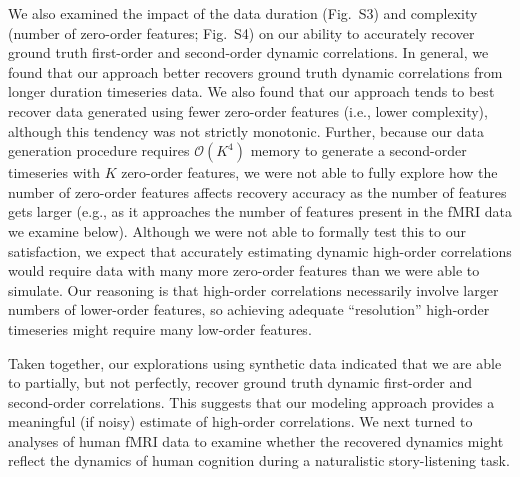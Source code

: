 \documentclass[english]{article}
\newcommand{\timeheatmap}{S3}
\newcommand{\features}{S4}
\begin{document}
We also examined the impact of the data duration (Fig.~\timeheatmap)
and complexity (number of zero-order features; Fig.~\features) on our
ability to accurately recover ground truth first-order and
second-order dynamic correlations.  In general, we found that our approach
better recovers ground truth dynamic correlations from longer duration
timeseries data.  We also found that our approach tends to best recover data generated
using fewer zero-order features (i.e., lower complexity), although
this tendency was not strictly monotonic.  Further, because our data
generation procedure requires $\mathcal{O}(K^{4})$ memory to generate
a second-order timeseries with $K$ zero-order features, we were not
able to fully explore how the number of zero-order features affects
recovery accuracy as the number of features gets larger (e.g., as it
approaches the number of features present in the fMRI data we examine
below).  Although we were not able to formally test this to our
satisfaction, we expect that accurately estimating dynamic high-order
correlations would require data with many more zero-order features
than we were able to simulate.  Our reasoning is that
high-order correlations necessarily involve larger numbers of
lower-order features, so achieving adequate ``resolution'' high-order
timeseries might require many low-order features.

Taken together, our explorations using synthetic data indicated that
we are able to partially, but not perfectly, recover ground truth
dynamic first-order and second-order correlations.  This suggests that
our modeling approach provides a meaningful (if noisy) estimate of
high-order correlations.  We next turned to analyses of human fMRI data
to examine whether the recovered dynamics might reflect the dynamics
of human cognition during a naturalistic story-listening task.
\end{document}
